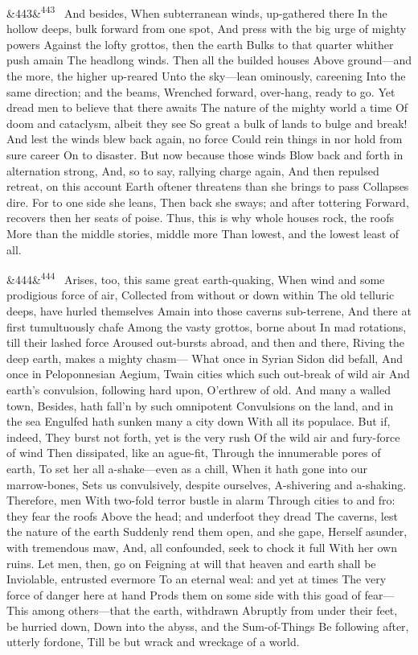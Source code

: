 \documentclass[12pt]{article}
\newcommand{\para}[1][]{\par\noindent\ifx&#1&\else\textsuperscript{\footnotesize #1}~\fi}
\begin{document}
\para[443] And besides, When subterranean winds, up-gathered there In the hollow deeps, bulk forward from one spot, And press with the big urge of mighty powers Against the lofty grottos, then the earth Bulks to that quarter whither push amain The headlong winds. Then all the builded houses Above ground---and the more, the higher up-reared Unto the sky---lean ominously, careening Into the same direction; and the beams, Wrenched forward, over-hang, ready to go. Yet dread men to believe that there awaits The nature of the mighty world a time Of doom and cataclysm, albeit they see So great a bulk of lands to bulge and break! And lest the winds blew back again, no force Could rein things in nor hold from sure career On to disaster. But now because those winds Blow back and forth in alternation strong, And, so to say, rallying charge again, And then repulsed retreat, on this account Earth oftener threatens than she brings to pass Collapses dire. For to one side she leans, Then back she sways; and after tottering Forward, recovers then her seats of poise. Thus, this is why whole houses rock, the roofs More than the middle stories, middle more Than lowest, and the lowest least of all.

\para[444] Arises, too, this same great earth-quaking, When wind and some prodigious force of air, Collected from without or down within The old telluric deeps, have hurled themselves Amain into those caverns sub-terrene, And there at first tumultuously chafe Among the vasty grottos, borne about In mad rotations, till their lashed force Aroused out-bursts abroad, and then and there, Riving the deep earth, makes a mighty chasm--- What once in Syrian Sidon did befall, And once in Peloponnesian Aegium, Twain cities which such out-break of wild air And earth's convulsion, following hard upon, O'erthrew of old. And many a walled town, Besides, hath fall'n by such omnipotent Convulsions on the land, and in the sea Engulfed hath sunken many a city down With all its populace. But if, indeed, They burst not forth, yet is the very rush Of the wild air and fury-force of wind Then dissipated, like an ague-fit, Through the innumerable pores of earth, To set her all a-shake---even as a chill, When it hath gone into our marrow-bones, Sets us convulsively, despite ourselves, A-shivering and a-shaking. Therefore, men With two-fold terror bustle in alarm Through cities to and fro: they fear the roofs Above the head; and underfoot they dread The caverns, lest the nature of the earth Suddenly rend them open, and she gape, Herself asunder, with tremendous maw, And, all confounded, seek to chock it full With her own ruins. Let men, then, go on Feigning at will that heaven and earth shall be Inviolable, entrusted evermore To an eternal weal: and yet at times The very force of danger here at hand Prods them on some side with this goad of fear--- This among others---that the earth, withdrawn Abruptly from under their feet, be hurried down, Down into the abyss, and the Sum-of-Things Be following after, utterly fordone, Till be but wrack and wreckage of a world.
\end{document}
